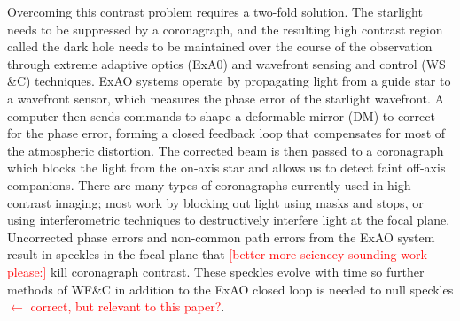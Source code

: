 \documentclass[12pt]{spieman}  %
\newcommand{\jrmadd}[1]{\textcolor{red}{#1}}
\newcommand{\jrmcom}[1]{\textcolor{red}{[#1]}}
\begin{document}
\begin{spacing}{2}
 Overcoming this contrast problem requires a two-fold solution. The starlight needs to be suppressed by a coronagraph, and the resulting high contrast region called the dark hole needs to be maintained over the course of the observation through extreme adaptive optics (ExA0)  and wavefront sensing and control (WS$\&$C) techniques. ExAO systems operate by propagating light from a guide star to a wavefront sensor, which measures the phase error of the starlight wavefront. A computer then sends commands to shape a deformable mirror (DM) to correct for the phase error, forming a closed feedback loop that compensates for most of the atmospheric distortion. The corrected beam is then passed to a coronagraph which blocks the light from the on-axis star and allows us to detect faint off-axis companions. There are many types of coronagraphs currently used in high contrast imaging; most work by blocking out light using masks and stops\cite{soummer2004apodized}, or using interferometric techniques to destructively interfere light at the focal plane.\cite{foo2005optical} Uncorrected phase errors and  non-common path errors from the ExAO system result in speckles in the focal plane that \jrmcom{better more sciencey sounding work please:} kill coronagraph contrast. These speckles evolve with time\cite{goebel2016evolutionary} so further methods of WF$\&$C in addition to the ExAO closed loop is needed to null speckles \jrmadd{$\leftarrow$ correct, but relevant to this paper?}.  


\end{spacing}
\end{document}
